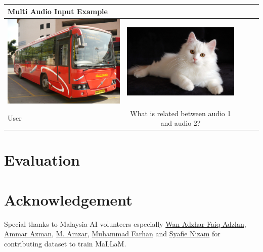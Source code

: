 \documentclass[preprint]{article}
\begin{document}
\begin{table}[hbt!]
  \setlength{\extrarowheight}{3pt} %
  \renewcommand{\arraystretch}{1.5} %
    \begin{tabular}{lcccl}
      \hline
      \textbf{Multi Audio Input Example} \\[6pt]  %
      \hline
      \hline 
      \includegraphics[width=0.45\linewidth,keepaspectratio]{pic/R.jpeg} & \includegraphics[width=0.45\linewidth,keepaspectratio]{pic/Persian-cat-breed.jpg} \\
      User & What is related between audio 1 and audio 2? \\
      \hline
    \end{tabular}
\end{table}


\section{Evaluation}



\section{Acknowledgement}
Special thanks to Malaysia-AI volunteers especially \href{https://www.linkedin.com/in/wan-adzhar-faiq-adzlan-19a27baa/}{Wan Adzhar Faiq Adzlan}, \href{https://www.linkedin.com/in/ammar-azman/}{Ammar Azman}, \href{https://www.linkedin.com/in/amzar96/}{M. Amzar}, \href{https://www.linkedin.com/in/muhammad-farhan-helmy-0529501a7/}{Muhammad Farhan} and \href{https://www.linkedin.com/in/syafie-nizam/}{Syafie Nizam} for contributing dataset to train MaLLaM.
\end{document}

